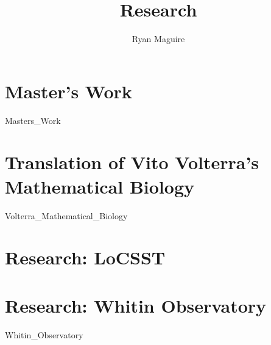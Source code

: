 \documentclass[crop=false,class=book,oneside]{standalone}
\begin{document}
    \newif\ifresearch
    \ifstandalone
        \title{Research}
        \author{Ryan Maguire}
        \date{\vspace{-5ex}}
        \maketitle
        \tableofcontents
        \listoffigures
        \listoftables
        \clearpage
    \fi
    \part{Master's Work}
        {Masters_Work}
    \part{Translation of Vito Volterra's Mathematical Biology}
        
                  {Volterra_Mathematical_Biology}
    \part{Research: LoCSST}
    \part{Research: Whitin Observatory}
        {Whitin_Observatory}
    \ifstandalone
        
    \fi
\end{document}
